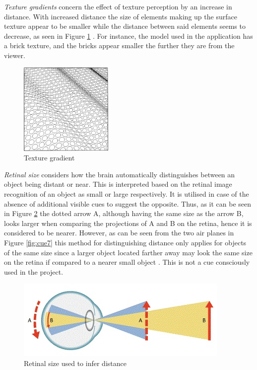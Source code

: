 \textit{Texture gradients} concern the effect of texture perception by an increase in distance. With increased distance the size of elements making up the surface texture appear to be smaller while the distance between said elements seems to decrease, as seen in Figure \ref{fig:cue5} \cite{Gale}. For instance, the model used in the application has a brick texture, and the bricks appear smaller the further they are from the viewer.

\begin{figure}[h!]
   \centering
   \includegraphics[width=0.4\textwidth]{figures/cue5.jpg}
   \caption{Texture gradient \cite{Heeger}}\label{fig:cue5}
\end{figure}

\textit{Retinal size} considers how the brain automatically distinguishes between an object being distant or near. This is interpreted based on the retinal image recognition of an object as small or large respectively. It is utilised in case of the absence of additional visible cues to suggest the opposite. Thus, as it can be seen in Figure \ref{fig:cue6} the dotted arrow A, although having the same size as the arrow B, looks larger when comparing the projections of A and B on the retina,  hence it is considered to be nearer. However, as can be seen from the two air planes in Figure \ref{fig:cue7} this method for distinguishing distance only applies for objects of the same size since a larger object located farther away may look the same size on the retina if compared to a nearer small object \cite{Gale}. This is not a cue consciously used in the project.

\begin{figure}[h!]
   \centering
   \includegraphics[scale=0.7]{figures/cue6.jpg}
   \caption{Retinal size used to infer distance \cite{Perslides}}\label{fig:cue6}
\end{figure}


